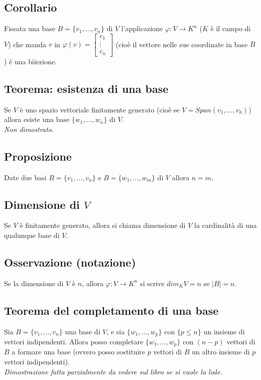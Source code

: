  \subsection{Corollario}
 Fissata una base $B=\{v_1,...,v_n\}$ di $V$ l'applicazione $\varphi : V\rightarrow K^n$ ($K$ è il campo di $V$) che manda $v$ in $\varphi (v)=\begin{bmatrix}c_1\\\vdots\\c_n\end{bmatrix}$ (cioè il vettore nelle sue coordinate in base $B$) è una biiezione.

 \subsection{Teorema: esistenza di una base}
 Se $V$ è uno spazio vettoriale finitamente generato (cioè se $V=Span(v_1,...,v_h)$) allora esiste una base $\{w_1,...,w_n\}$ di $V$.
 \\\textit{Non dimostrato.}

 \subsection{Proposizione}
 Date due basi $B=\{v_1,...,v_n\}$ e $B=\{w_1,...,w_m\}$ di $V$ allora $n=m$.

 \subsection{Dimensione di $V$}
 Se $V$ è finitamente generato, allora si chiama dimensione di $V$ la cardinalità di una qualunque base di $V$.

 \subsection{Osservazione (notazione)}
 Se la dimensione di $V$ è $n$, allora $\varphi :V\rightarrow K^n$ si scrive $dim_KV=n$ se $|B|=n$.

 \subsection{Teorema del completamento di una base}
 Sia $B=\{v_1,...,v_n\}$ una base di $V$, e sia $\{w_1,...,w_p\}$ con $\{p\leq n\}$ un insieme di vettori indipendenti. Allora posso completare $\{w_1,...,w_p\}$ con $(n-p)$ vettori di $B$ a formare una base (ovvero posso sostituire $p$ vettori di $B$ un altro insieme di $p$ vettori indipendenti).
 \\\textit{Dimostrazione fatta parzialmente da vedere sul libro se si vuole la lode.}

